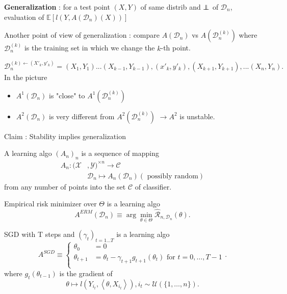 \textbf{Generalization} : for a test point $(X, Y)$ of same distrib and $\perp\!\!\!\!\perp $ of $\mathcal{D}_n$, evaluation of $\mathbb{E}[l(Y, A(\mathcal{D}_n)(X))]$

Another point of view of generalization : compare $ A(\mathcal{D}_n ) $ vs $ A(\mathcal{D}_n^{(k)}) $ where $ \mathcal{D} _n ^{(k)} $ is the training set in which we change the $ k $-th point.

\[
    \mathcal{D}_n^{(k) \leftarrow (X'_{k}, y'_{k} )} = {(X_1, Y_1) ... (X_{k-1}, Y_{k-1}),(x'_{k}, y'_{k}),(X_{k+1}, Y_{k+1}), ... (X_n, Y_n)}
.\]
In the picture  \begin{itemize}
    \item $ A^1 (\mathcal{D}_n) $ is "close" to $ A^1( \mathcal{D }_n ^{(k)}) $ 
    \item $ A^2 (\mathcal{D}_n) $ is very different from $ A^2( \mathcal{D }_n ^{(k)}) $ $\rightarrow A^2$  is unstable.
\end{itemize}
Claim : Stability implies generalization 

\begin{defn}[]
    A learning algo $(A_n)_n$ is a sequence of mapping
    \begin{align*}
        A_n : (\mathcal{X}&, \mathcal{Y})^{\times n} \to \mathcal{C} \\
                &\mathcal{D}_n \mapsto A_n (\mathcal{D}_n ) (\text{ possibly random})
    \end{align*}
    from any number of points into the set $\mathcal{C}$ of classifier.
\end{defn}

\begin{exmp}[1]
    Empirical risk minimizer over $ \Theta  $ is a learning algo 
    \[
        A^{ERM}(\mathcal{D}_n) \equiv \arg \min_{\theta \in \Theta}\hat{\mathcal{R}}_{n, \mathcal{D}_n }(\theta )
    .\]
    
\end{exmp}


\begin{exmp}
    SGD with T steps and $(\gamma _t)_{t=1...T}$ is a learning algo
    \[
        A^{SGD} \equiv \begin{cases}
            \theta _0 &= 0 \\
            \theta _{t+1} &= \theta _t - \gamma _{t+1} g_{t+1} (\theta _t) \text{ for } t = 0, \dots, T-1 \\
        \end{cases}
    .\]
    where $ g_t (\theta _{t-1} ) $ is the gradient of 
    \[
        \theta  \mapsto l(Y_{i_t} , \left\langle \theta , X_{i_t} \right\rangle ), i_t \sim \mathcal{U}(\{1, \dots, n\})
    .\]
    
\end{exmp}

